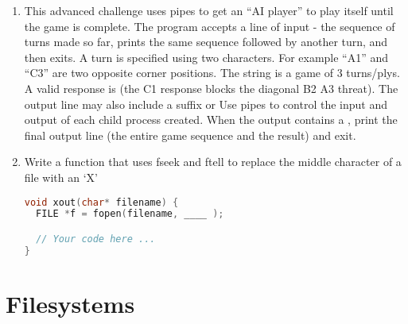 \begin{enumerate}
\item This advanced challenge uses pipes to get an ``AI player'' to play itself until the game is complete. The program  accepts a line of input - the sequence of turns made so far, prints the same sequence followed by another turn, and then exits. A turn is specified using two characters. For example ``A1'' and ``C3'' are two opposite corner positions. The string  is a game of 3 turns/plys. A valid response is  (the C1 response blocks the diagonal B2 A3 threat). The output line may also include a suffix    or  Use pipes to control the input and output of each child process created. When the output contains a \keyword{-}, print the final output line (the entire game sequence and the result) and exit.

\item Write a function that uses fseek and ftell to replace the middle character of a file with an `X'

\begin{lstlisting}[language=C]
void xout(char* filename) {
  FILE *f = fopen(filename, ____ );

  // Your code here ...
}
\end{lstlisting}

\end{enumerate}

\section{Filesystems}

